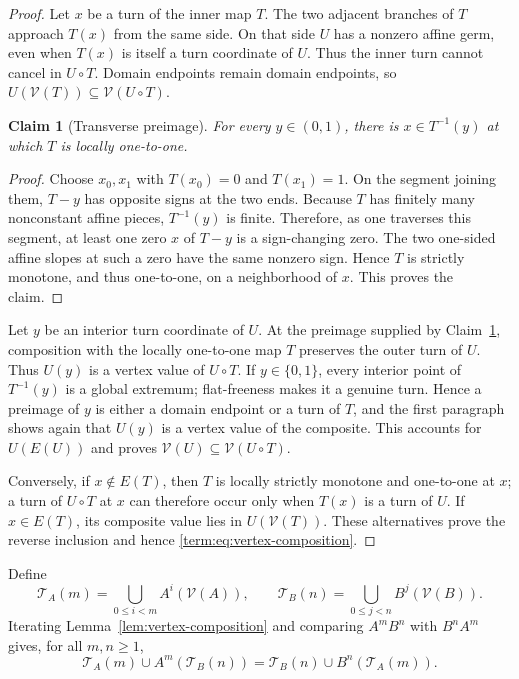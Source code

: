 \documentclass[11pt]{article}
\newtheorem{claim}[theorem]{Claim}
\theoremstyle{definition}
\theoremstyle{remark}
\begin{document}
\begin{proof}
Let $x$ be a turn of the inner map $T$.  The two adjacent branches of $T$
approach $T(x)$ from the same side.  On that side $U$ has a nonzero affine
germ, even when $T(x)$ is itself a turn coordinate of $U$.  Thus the inner
turn cannot cancel in $U\circ T$.  Domain endpoints remain domain endpoints,
so
$U(\mathcal V(T))\subseteq\mathcal V(U\circ T)$.

\begin{claim}[Transverse preimage]\label{clm:pl-transverse-preimage}
For every \(y\in(0,1)\), there is \(x\in T^{-1}(y)\) at which \(T\) is
locally one-to-one.
\end{claim}

\begin{proof}
Choose \(x_0,x_1\) with \(T(x_0)=0\) and \(T(x_1)=1\).  On the segment
joining them, \(T-y\) has opposite signs at the two ends.  Because \(T\) has
finitely many nonconstant affine pieces, \(T^{-1}(y)\) is finite.  Therefore,
as one traverses this segment, at least one zero \(x\) of \(T-y\) is a
sign-changing zero.  The two one-sided affine slopes at such a zero have the
same nonzero sign.  Hence \(T\) is strictly monotone, and thus one-to-one, on
a neighborhood of \(x\).  This proves the claim.
\end{proof}

Let \(y\) be an interior turn coordinate of \(U\).  At the preimage supplied
by Claim~\ref{clm:pl-transverse-preimage}, composition with the locally
one-to-one map \(T\) preserves the outer turn of \(U\).  Thus \(U(y)\) is a
vertex value of \(U\circ T\).  If \(y\in\{0,1\}\), every interior point of
\(T^{-1}(y)\) is a global extremum; flat-freeness makes it a genuine turn.
Hence a preimage of \(y\) is either a domain endpoint or a turn of \(T\),
and the first paragraph shows again that \(U(y)\) is a vertex value of the
composite.  This accounts for \(U(E(U))\) and proves
\(\mathcal V(U)\subseteq\mathcal V(U\circ T)\).

Conversely, if $x\notin E(T)$, then $T$ is locally strictly monotone and
one-to-one at $x$; a turn of $U\circ T$ at $x$ can therefore occur only when
$T(x)$ is a turn of $U$.  If $x\in E(T)$, its composite value lies in
$U(\mathcal V(T))$.  These alternatives prove the reverse inclusion and
hence \eqref{term:eq:vertex-composition}.
\end{proof}

Define
\begin{equation}\label{term:eq:TA-TB}
 \mathcal T_A(m)=\bigcup_{0\leq i<m}A^i(\mathcal V(A)),\qquad
 \mathcal T_B(n)=\bigcup_{0\leq j<n}B^j(\mathcal V(B)).
\end{equation}
Iterating Lemma~\ref{lem:vertex-composition} and comparing $A^mB^n$ with
$B^nA^m$ gives, for all $m,n\geq1$,
\begin{equation}\label{term:eq:rectangle-identity}
 \mathcal T_A(m)\cup A^m(\mathcal T_B(n))
 =
 \mathcal T_B(n)\cup B^n(\mathcal T_A(m)).
\end{equation}
\end{document}
